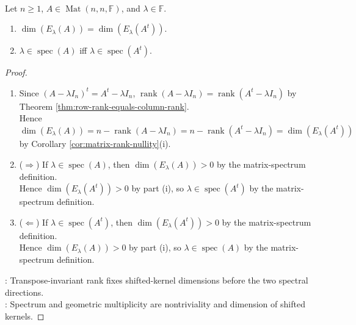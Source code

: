 \begin{proposition} \label{prop:transpose-preserves-spectrum-and-geometric-multiplicity} \\
Let $n\geq1$, $A\in\operatorname{Mat}(n,n,\mathbb{F})$, and $\lambda\in\mathbb{F}$.
\begin{enumerate}[label=(\roman*)]
\setlength{\itemsep}{0pt}
\item $\dim(E_{\lambda}(A))=\dim(E_{\lambda}(A^t))$.
\item $\lambda\in\operatorname{spec}(A)$ iff $\lambda\in\operatorname{spec}(A^t)$.
\end{enumerate}
\begin{proof}
\begin{enumerate}[label=(\roman*)]
\setlength{\itemsep}{0pt}
\item[$(i)$] Since $(A-\lambda I_n)^t=A^t-\lambda I_n$, $\operatorname{rank}(A-\lambda I_n)=\operatorname{rank}(A^t-\lambda I_n)$ by Theorem \ref{thm:row-rank-equals-column-rank}.\\
Hence $\dim(E_{\lambda}(A))=n-\operatorname{rank}(A-\lambda I_n)=n-\operatorname{rank}(A^t-\lambda I_n)=\dim(E_{\lambda}(A^t))$ by Corollary \ref{cor:matrix-rank-nullity}(i).
\item[$(ii)$] ($\Rightarrow$) If $\lambda\in\operatorname{spec}(A)$, then $\dim(E_{\lambda}(A))>0$ by the matrix-spectrum definition.\\
Hence $\dim(E_{\lambda}(A^t))>0$ by part (i), so $\lambda\in\operatorname{spec}(A^t)$ by the matrix-spectrum definition.
\item[$(ii)$] ($\Leftarrow$) If $\lambda\in\operatorname{spec}(A^t)$, then $\dim(E_{\lambda}(A^t))>0$ by the matrix-spectrum definition.\\
Hence $\dim(E_{\lambda}(A))>0$ by part (i), so $\lambda\in\operatorname{spec}(A)$ by the matrix-spectrum definition.
\end{enumerate}
: Transpose-invariant rank fixes shifted-kernel dimensions before the two spectral directions.\\
: Spectrum and geometric multiplicity are nontriviality and dimension of shifted kernels.
\end{proof}
\end{proposition}

